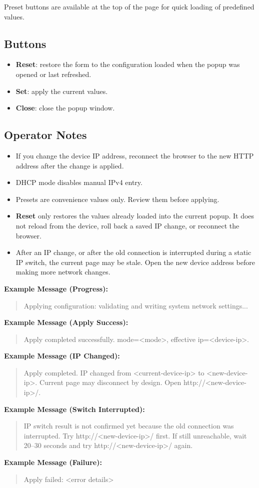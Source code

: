 \documentclass[11pt,a4paper]{article}
\newcommand{\messageexample}[2]{%
\noindent\textbf{Example Message (#1):}\\%
\begin{quote}\raggedright #2\end{quote}%
}
\begin{document}
Preset buttons are available at the top of the page for quick loading of predefined values.

\subsection{Buttons}
\begin{itemize}
\item \textbf{Reset}: restore the form to the configuration loaded when the popup was opened or last refreshed.
\item \textbf{Set}: apply the current values.
\item \textbf{Close}: close the popup window.
\end{itemize}

\subsection{Operator Notes}
\begin{itemize}
\item If you change the device IP address, reconnect the browser to the new HTTP address after the change is applied.
\item DHCP mode disables manual IPv4 entry.
\item Presets are convenience values only. Review them before applying.
\item \textbf{Reset} only restores the values already loaded into the current popup. It does not reload from the device, roll back a saved IP change, or reconnect the browser.
\item After an IP change, or after the old connection is interrupted during a static IP switch, the current page may be stale. Open the new device address before making more network changes.
\end{itemize}

\messageexample{Progress}{Applying configuration: validating and writing system network settings...}
\messageexample{Apply Success}{Apply completed successfully. mode=<mode>, effective ip=<device-ip>.}
\messageexample{IP Changed}{Apply completed. IP changed from <current-device-ip> to <new-device-ip>. Current page may disconnect by design. Open http://<new-device-ip>/.}
\messageexample{Switch Interrupted}{IP switch result is not confirmed yet because the old connection was interrupted. Try http://<new-device-ip>/ first. If still unreachable, wait 20--30 seconds and try http://<new-device-ip>/ again.}
\messageexample{Failure}{Apply failed: <error details>}
\end{document}
